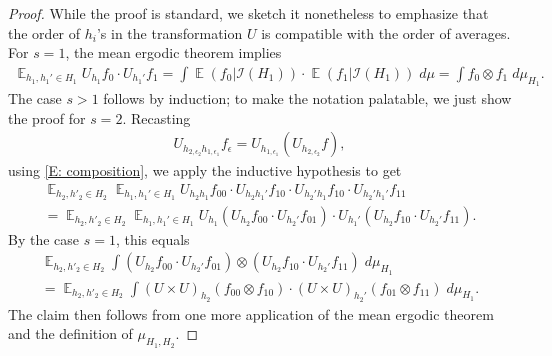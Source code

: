 \documentclass[11pt]{amsart}
\theoremstyle{definition}
\DeclareMathOperator*{\E}{\mathbb{E}}
\newcommand{\CI}{{\mathcal I}}
\newcommand{\eps}{\epsilon}
\newcommand{\1}{{\mathbf{1}}}
\begin{document}
\begin{proof}
While the proof is standard, we sketch it nonetheless to emphasize that the order of $h_i$'s in the transformation $U$ is compatible with the order of averages.
    For $s=1$, the mean ergodic theorem implies
    \begin{align*}
        \E_{h_1,h_1'\in H_1} U_{h_1}f_0\cdot  U_{h_1'}f_1 = \int \E(f_0|\CI(H_1))\cdot \E(f_1|\CI(H_1))\; d\mu = \int f_0 \otimes f_1\; d\mu_{H_1}. 
    \end{align*}
    The case $s>1$ follows by induction; to make the notation palatable, we just show the proof for $s=2$. Recasting
    \begin{align*}
        U_{h_{2,\eps_2}h_{1,\eps_1}}f_\eps = U_{h_{1,\eps_1}}(U_{h_{2,\eps_2}}f),
    \end{align*}
    using \eqref{E: composition},
    we apply the inductive hypothesis to get
        \begin{multline*}
        \E_{h_2,h'_2\in H_2}\E_{h_1,h_1'\in H_1} U_{h_2 h_1}f_{00}\cdot U_{h_2 h_1'}f_{10}\cdot U_{h_2' h_1}f_{10}\cdot U_{h_2' h_1'}f_{11}\\ = \E_{h_2,h'_2\in H_2}\E_{h_1,h_1'\in H_1} U_{h_1}(U_{h_2}f_{00}\cdot U_{h_2'}f_{01})\cdot U_{h_1'}(U_{h_2}f_{10}\cdot U_{h_2'}f_{11}).
    \end{multline*}
    By the case $s=1$, this equals
    \begin{multline*}
        \E_{h_2,h'_2\in H_2} \int (U_{h_2}f_{00}\cdot U_{h_2'}f_{01})\otimes (U_{h_2}f_{10}\cdot U_{h_2'}f_{11})\; d\mu_{H_1}\\ = \E_{h_2,h'_2\in H_2}\int (U\times U)_{h_2}(f_{00}\otimes f_{10})\cdot (U\times U)_{h_2'}(f_{01}\otimes f_{11})\; d\mu_{H_1}.
    \end{multline*}
    The claim then follows from one more application of the mean ergodic theorem and the definition of $\mu_{H_1, H_2}$.
\end{proof}
\end{document}
